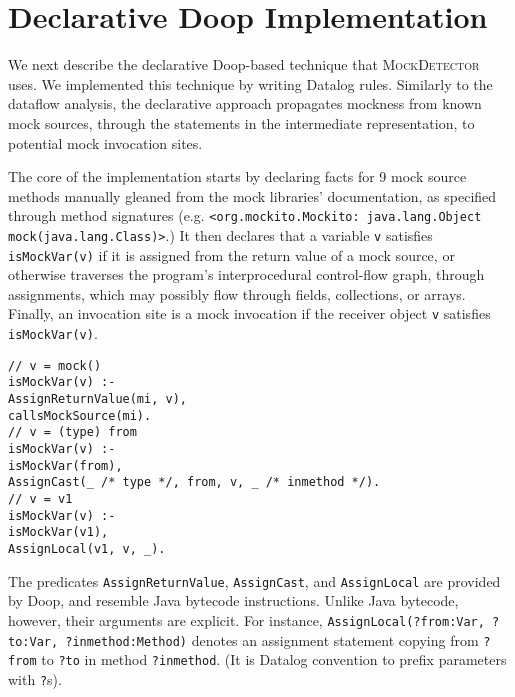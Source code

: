 
\section{Declarative Doop Implementation}
\label{sec:dec-doop}

We next describe the declarative Doop-based technique that \textsc{MockDetector} uses. We implemented this technique by writing Datalog rules. Similarly to the dataflow analysis, the declarative approach propagates mockness from known mock sources, through the statements in the intermediate representation, to potential mock invocation sites.

The core of the implementation starts by declaring facts for 9 mock source methods manually gleaned from the mock libraries' documentation, as specified through method signatures (e.g. 
\texttt{<org.mockito.Mockito: java.lang.Object mock(java.lang.Class)>}.)
It then declares that a variable {\tt v} satisfies \verb+isMockVar(v)+ if it is assigned from the return value of a mock source, or otherwise traverses the program's interprocedural control-flow graph, through assignments, which may possibly flow through fields, collections, or arrays. Finally, an invocation site is a mock invocation if the receiver object {\tt v} satisfies \verb+isMockVar(v)+.

\begin{lstlisting}[basicstyle=\ttfamily\small,numbers=none,label={lst:core}]
// v = mock()
isMockVar(v) :-
AssignReturnValue(mi, v),
callsMockSource(mi).
// v = (type) from
isMockVar(v) :-
isMockVar(from),
AssignCast(_ /* type */, from, v, _ /* inmethod */).
// v = v1
isMockVar(v) :-
isMockVar(v1),
AssignLocal(v1, v, _).
\end{lstlisting}

The predicates \texttt{AssignReturnValue}, \texttt{AssignCast}, and \texttt{AssignLocal} are provided by Doop, and resemble Java bytecode instructions. Unlike Java bytecode, however, their arguments are explicit. For instance, \texttt{AssignLocal(?from:Var, ?to:Var, ?inmethod:Method)} denotes an assignment statement copying from \texttt{?from} to \texttt{?to} in method \texttt{?inmethod}. (It is Datalog convention to prefix parameters with \texttt{?}s).

